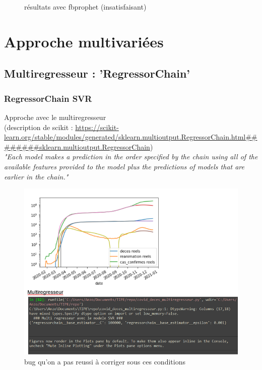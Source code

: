 \documentclass{beamer}
\begin{document}
\begin{frame}
\begin{figure}[t]
\begin{minipage}{0.3\textwidth}
		\end{minipage}
	\caption{résultats avec fbprophet (insatisfaisant)}
	\end{figure}
\end{frame}

\section{Approche multivariées}
\subsection{Multiregresseur : 'RegressorChain'}
\begin{frame}
	\frametitle{RegressorChain SVR}
	Approche avec le multiregresseur\\
	\tiny{(description de scikit : \url{https://scikit-learn.org/stable/modules/generated/sklearn.multioutput.RegressorChain.html########sklearn.multioutput.RegressorChain})}\\
	\normalsize{\textit{"Each model makes a prediction in the order specified by the chain using all of the available features provided to the model plus the predictions of models that are earlier in the chain."}}
	\begin{figure}[h]
		\includegraphics[scale=0.3]{mulitregr_epic_fail}
		\caption{bug qu'on a pas reussi à corriger sous ces conditions}
	\end{figure}
\end{frame}
\end{document}
